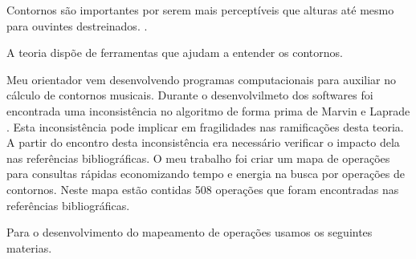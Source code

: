 \documentclass[11pt]{article}
\begin{document}
Contornos são importantes por serem mais perceptíveis que alturas
até mesmo para ouvintes destreinados.
\cite[p. 225]{Marvin1987}.

A teoria dispõe de ferramentas que ajudam a entender os contornos.

Meu orientador vem desenvolvendo programas computacionais para
auxiliar no cálculo de contornos musicais.
Durante o desenvolvilmeto dos softwares foi encontrada uma
inconsistência no algoritmo de forma prima de Marvin e Laprade 
\cite{Marvin1987}.
Esta inconsistência pode implicar em fragilidades nas ramificações
desta teoria. A partir do encontro desta inconsistência era necessário
verificar o impacto dela nas referências bibliográficas. O meu
trabalho foi criar um mapa de operações para consultas rápidas
economizando tempo e energia na busca por operações de contornos.
Neste mapa estão contidas 508 operações que foram encontradas nas
referências bibliográficas.

\label{sec:materiais}

Para o desenvolvimento do mapeamento de operações usamos os seguintes
materias.

\end{document}
